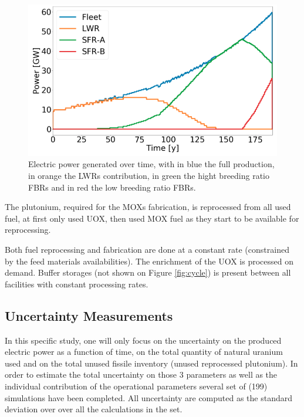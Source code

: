 \documentclass{anstrans}
\begin{document}
\begin{figure}[ht] %
    \centering
    \includegraphics[scale=0.32]{power.png}
    \caption{Electric power generated over time, with in blue the full production,
        in orange the \glspl{LWR} contribution, in green the hight breeding ratio
        \glspl{FBR} and in red the low breeding ratio \glspl{FBR}.}\label{fig:power}
\end{figure}


The plutonium, required for the \glspl{MOX} fabrication, is reprocessed
from all used fuel, at first only used UOX, then used MOX fuel as they start to
be available for reprocessing.

Both fuel reprocessing and fabrication are done at a constant rate (constrained
by the feed materials availabilities). The enrichment of the UOX is processed on
demand. Buffer storages (not shown on Figure \ref{fig:cycle}) is present between
all facilities with constant processing rates.


\subsection{Uncertainty Measurements}
In this specific study, one will only focus on the uncertainty on the produced
electric power as a function of time, on the total quantity of natural uranium
used and on the total unused fissile inventory (unused reprocessed plutonium).
In order to estimate the total uncertainty on those 3 parameters as well as the
individual contribution of the operational parameters several set of (199)
simulations have been completed.  All uncertainty are computed as the standard
deviation over over all the calculations in the set.
\end{document}
